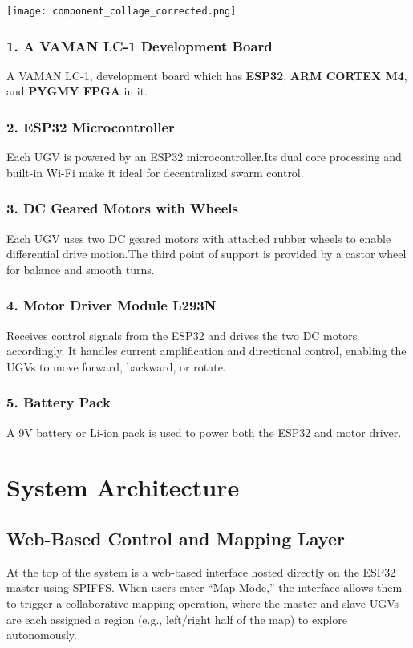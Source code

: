 \documentclass[a4paper,12pt]{report}
\begin{document}
\begin{center}
    \texttt{[image: component\_collage\_corrected.png]}
\end{center}


\subsection*{1. A VAMAN LC-1 Development Board}
A VAMAN LC-1, development board which has \textbf{ESP32}, \textbf{ARM CORTEX M4}, and \textbf{PYGMY FPGA} in it.

\subsection*{2. ESP32 Microcontroller}
Each UGV is powered by an ESP32 microcontroller.Its dual core processing and built-in Wi-Fi make it ideal for decentralized swarm control.

\subsection*{3. DC Geared Motors with Wheels}
Each UGV uses two DC geared motors with attached rubber wheels to enable differential drive motion.The third point of support is provided by a castor wheel for balance and smooth turns.

\subsection*{4. Motor Driver Module L293N}
Receives control signals from the ESP32 and drives the two DC motors accordingly. It handles current amplification and directional control, enabling the UGVs to move forward, backward, or rotate.

\subsection*{5. Battery Pack}
A 9V battery or Li-ion pack is used to power both the ESP32 and motor driver.








\chapter{System Architecture}
\section{Web-Based Control and Mapping Layer}
At the top of the system is a web-based interface hosted directly on the ESP32 master using SPIFFS. When users enter “Map Mode,” the interface allows them to trigger a collaborative mapping operation, where the master and slave UGVs are each assigned a region (e.g., left/right half of the map) to explore autonomously.
\end{document}
